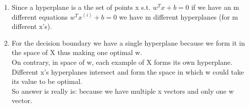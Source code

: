 \documentclass{article}
\newcommand{\ith}{^{(i)}}
\begin{document}
\begin{enumerate}
	\begin{enumerate}
		\item Since a hyperplane is a the set of points x s.t. $w^Tx+b=0$  if we have an m different equations $w^Tx\ith +b=0$ we have m different hyperplanes (for m different x's). 
		\item For the decision boundary we have a single hyperplane because we form it in the space of X thus making one optimal w.\\
		On contrary, in space of w, each example of X forms its own hyperplane. Different x's hyperplanes intersect and form the space in which w could take its value to be optimal.\\
		So answer is really is: because we have multiple x vectors and only one w vector. 
	\end{enumerate}
	
\end{enumerate}



\pagebreak
\end{document}
